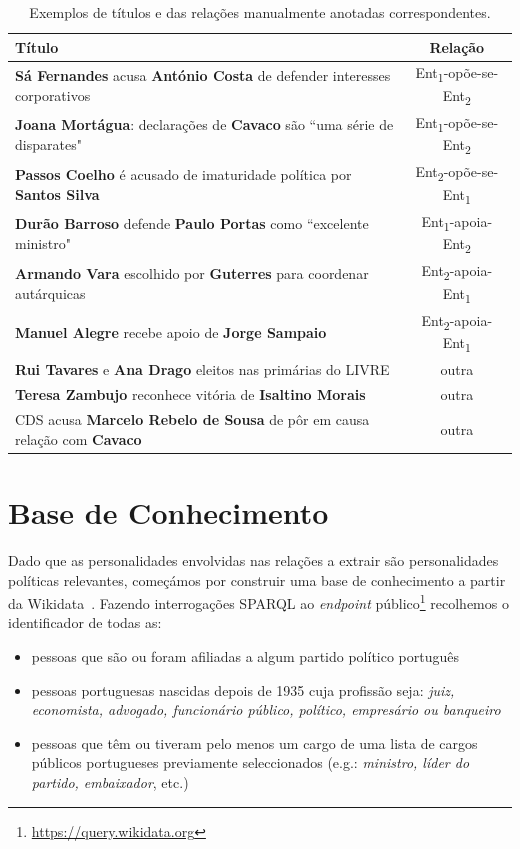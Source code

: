 \documentclass[a4paper, twocolumn, 11pt, twoside]{article}
\begin{document}
\begin{table}[!h]
  \centering
  \begin{tabular}{lc}
      {\bf Título} & {\bf Relação} \\
      \hline
	  \textbf{Sá Fernandes} acusa \textbf{António Costa} de defender interesses corporativos &	Ent\textsubscript{1}-opõe-se-Ent\textsubscript{2} \\
	  \textbf{Joana Mortágua}: declarações de \textbf{Cavaco} são ``uma série de disparates" & Ent\textsubscript{1}-opõe-se-Ent\textsubscript{2} \\
	  \textbf{Passos Coelho} é acusado de imaturidade política por \textbf{Santos Silva} &	Ent\textsubscript{2}-opõe-se-Ent\textsubscript{1}	\\
	  \textbf{Durão Barroso} defende \textbf{Paulo Portas} como ``excelente ministro" & Ent\textsubscript{1}-apoia-Ent\textsubscript{2}	\\
	  \textbf{Armando Vara} escolhido por \textbf{Guterres} para coordenar autárquicas & Ent\textsubscript{2}-apoia-Ent\textsubscript{1}	\\
	  \textbf{Manuel Alegre} recebe apoio de \textbf{Jorge Sampaio} & Ent\textsubscript{2}-apoia-Ent\textsubscript{1}	\\
	  \textbf{Rui Tavares} e \textbf{Ana Drago} eleitos nas primárias do LIVRE & outra	\\
	  \textbf{Teresa Zambujo} reconhece vitória de \textbf{Isaltino Morais} & outra	\\
	  CDS acusa \textbf{Marcelo Rebelo de Sousa} de pôr em causa relação com \textbf{Cavaco} & outra \\
	  \hline
  \end{tabular}
  \caption{Exemplos de títulos e das relações manualmente anotadas correspondentes.}
  \label{tab:samples}
\end{table}

\section{Base de Conhecimento}
\label{sec_kb}
Dado que as personalidades envolvidas nas relações a extrair são personalidades políticas relevantes, começámos por construir uma base de conhecimento a partir da Wikidata~\citep{MKGGB2018}. Fazendo interrogações SPARQL ao \textit{endpoint} público\footnote{\url{https://query.wikidata.org}} recolhemos o identificador de todas as:

\begin{itemize}  
\item pessoas que são ou foram afiliadas a algum partido político português
\item pessoas portuguesas nascidas depois de 1935 cuja profissão seja: \textit{juiz, economista, advogado, funcionário público, político, empresário ou banqueiro}
\item pessoas que têm ou tiveram pelo menos um cargo de uma lista de cargos públicos portugueses previamente seleccionados (e.g.: \textit{ministro, líder do partido, embaixador}, etc.)
\end{itemize}  
\end{document}
